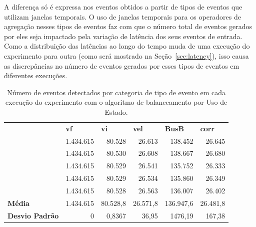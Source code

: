 A diferença só é expressa nos eventos obtidos a partir de tipos de eventos que utilizam janelas temporais. O uso de janelas temporais para os operadores de agregação nesses tipos de eventos faz com que o número total de eventos gerados por eles seja impactado pela variação de latência dos seus eventos de entrada. Como a distribuição das latências ao longo do tempo muda de uma execução do experimento para outra (como será mostrado na Seção~\ref{sec:latency}), isso causa as discrepâncias no número de eventos gerados por esses tipos de eventos em diferentes execuções.





\begin{table}[h!]
\centering
\caption{Número de eventos detectados por categoria de tipo de evento em cada execução do experimento com o algoritmo de balanceamento por Uso de Estado.}
\begin{tabular}{lrrrrr}
          & \multicolumn{1}{l}{\textbf{vf}} & \multicolumn{1}{l}{\textbf{vi}} & \multicolumn{1}{l}{\textbf{vel}} & \multicolumn{1}{l}{\textbf{BusB}} & \multicolumn{1}{l}{\textbf{corr}}  \\
  & 1.434.615 & 80.528 & 26.613  & 138.452 & 26.645   \\
  & 1.434.615 & 80.530 & 26.608 & 138.667  & 26.680      \\
  & 1.434.615 & 80.529   & 26.541    & 135.752    & 26.333                     \\
  & 1.434.615 & 80.529   & 26.534    & 135.860    & 26.349                     \\
 & 1.434.615 & 80.528   & 26.563    & 136.007    & 26.402                     \\
\textbf{Média}      & 1.434.615 & 80.528,8 & 26.571,8  & 136.947,6  & 26.481,8                   \\
\textbf{Desvio Padrão}   & 0       & 0,8367      & 36,95        & 1476,19         & 167,38         
\end{tabular}
\label{Tab:events_SU_and_avg}
\end{table}


